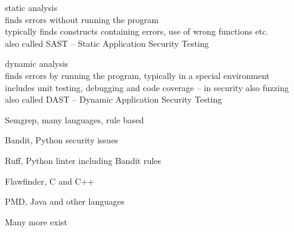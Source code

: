 \documentclass[Screen16to9,17pt]{foils}
\begin{document}

\begin{list1}
\item {\Large static analysis}\\
finds errors without running the program\\
typically finds constructs containing errors, use of wrong functions etc.\\
also called SAST -- Static Application Security Testing
\item {\Large dynamic analysis}\\
finds errors by running the program, typically in a special environment\\
includes unit testing, debugging and code coverage -- in security also fuzzing\\
also called DAST -- Dynamic Application Security Testing
\end{list1}

\begin{list2}
\item Semgrep, many languages, rule based 
\item Bandit, Python security issues 
\item Ruff, Python linter including Bandit rules 
\item Flawfinder, C and C++ 
\item PMD, Java and other languages 
\end{list2}

Many more exist 
\end{document}
